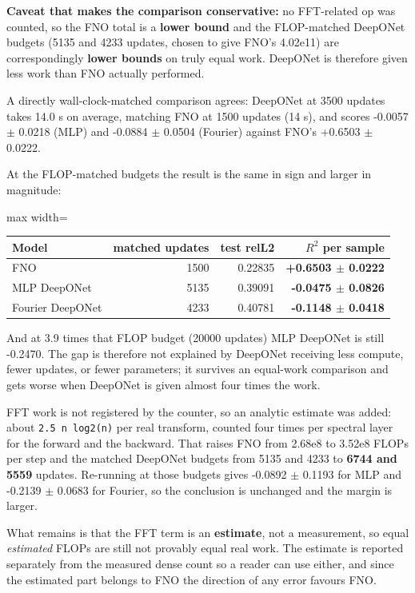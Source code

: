\documentclass[preprint,12pt]{elsarticle}
\begin{document}
\textbf{Caveat that makes the comparison conservative:} no FFT-related op was counted, so the FNO total is a \textbf{lower bound} and the FLOP-matched DeepONet budgets (5135 and 4233 updates, chosen to give FNO's 4.02e11) are correspondingly \textbf{lower bounds} on truly equal work. DeepONet is therefore given less work than FNO actually performed.

A directly wall-clock-matched comparison agrees: DeepONet at 3500 updates takes 14.0 s on average, matching FNO at 1500 updates (14 s), and scores -0.0057 $\pm$ 0.0218 (MLP) and -0.0884 $\pm$ 0.0504 (Fourier) against FNO's +0.6503 $\pm$ 0.0222.

At the FLOP-matched budgets the result is the same in sign and larger in magnitude:

\begin{center}
\begin{adjustbox}{max width=\linewidth}
\small
\begin{tabular}{lrrr}
\toprule
Model & matched updates & test relL2 & \textbf{$R^2$ per sample} \\
\midrule
FNO & 1500 & 0.22835 & \textbf{+0.6503 $\pm$ 0.0222} \\
MLP DeepONet & 5135 & 0.39091 & \textbf{-0.0475 $\pm$ 0.0826} \\
Fourier DeepONet & 4233 & 0.40781 & \textbf{-0.1148 $\pm$ 0.0418} \\
\bottomrule
\end{tabular}
\end{adjustbox}
\end{center}


And at 3.9 times that FLOP budget (20000 updates) MLP DeepONet is still -0.2470. The gap is therefore not explained by DeepONet receiving less compute, fewer updates, or fewer parameters; it survives an equal-work comparison and gets worse when DeepONet is given almost four times the work.

FFT work is not registered by the counter, so an analytic estimate was added: about \texttt{2.5 n log2(n)} per real transform, counted four times per spectral layer for the forward and the backward. That raises FNO from 2.68e8 to 3.52e8 FLOPs per step and the matched DeepONet budgets from 5135 and 4233 to \textbf{6744 and 5559} updates. Re-running at those budgets gives -0.0892 $\pm$ 0.1193 for MLP and -0.2139 $\pm$ 0.0683 for Fourier, so the conclusion is unchanged and the margin is larger.

What remains is that the FFT term is an \textbf{estimate}, not a measurement, so equal \emph{estimated} FLOPs are still not provably equal real work. The estimate is reported separately from the measured dense count so a reader can use either, and since the estimated part belongs to FNO the direction of any error favours FNO.
\end{document}
